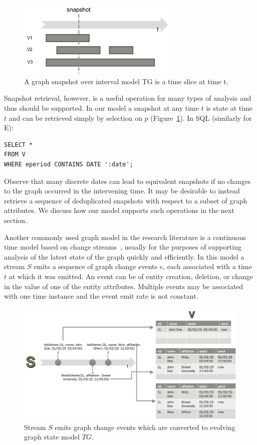 \begin{figure}[h]
\includegraphics[width=3in]{figs/getsnap.pdf}
\caption{A graph snapshot over interval model TG is a time slice at time t.}
\label{fig:getsnap}
\end{figure}

Snapshot retrieval, however, is a useful operation for many types of
analysis and thus should be supported.  In our model a snapshot at any
time $t$ is state at time $t$ and can be retrieved simply by selection
on $p$ (Figure~\ref{fig:getsnap}). In SQL (similarly for E):

\begin{small}
\begin{verbatim}
SELECT *
FROM V
WHERE eperiod CONTAINS DATE ':date';
\end{verbatim}
\end{small}

Observe that many discrete dates can lead to equivalent snapshots if
no changes to the graph occurred in the intervening time.  It may be
desirable to instead retrieve a sequence of deduplicated snapshots
with respect to a subset of graph attributes.  We discuss how our
model supports such operations in the next section.

Another commonly used graph model in the research literature is a
continuous time model based on change
streams~\cite{Cheng2012,Ediger2012}, usually for the purposes of
supporting analysis of the latest state of the graph quickly and
efficiently.  In this model a stream $S$ emits a sequence of graph
change events $e$, each associated with a time $t$ at which it was
emitted.  An event can be of entity creation, deletion, or change in
the value of one of the entity attributes.  Multiple events may be
associated with one time instance and the event emit rate is not
constant.

\begin{figure}[t]
\centering
\includegraphics[width=6in]{figs/stream_to_state.pdf}
\caption{Stream $S$ emits graph change events which are converted to
  evolving graph state model $TG$.}
\label{fig:streamtotg}
\end{figure}

